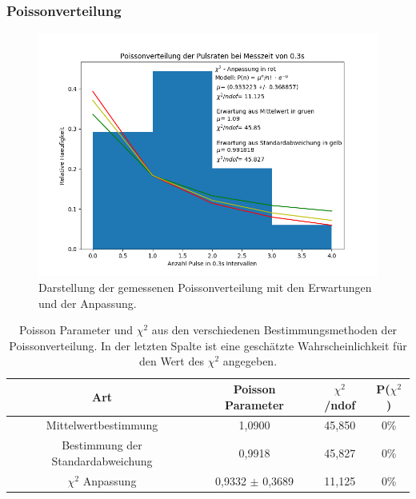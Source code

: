 \documentclass[12pt,a4paper]{article}
\begin{document}
\subsubsection{Poissonverteilung}
\begin{figure}
\centering
\includegraphics[scale=0.8]{Bilder/poisson.PNG}
\caption{Darstellung der gemessenen Poissonverteilung mit den Erwartungen und der Anpassung.}
\label{fig:Poisson}
\end{figure}

\begin{table}
\centering
\begin{tabular}{|c|c|c|c|}
\hline 
Art & Poisson Parameter & $\chi ^2$ /ndof & P($\chi ^2$) \\ 
\hline 
Mittelwertbestimmung & 1,0900 & 45,850 & 0\% \\ 
\hline 
Bestimmung der Standardabweichung & 0,9918 & 45,827 & 0\% \\ 
\hline 
$\chi ^2$ Anpassung & 0,9332 $\pm$ 0,3689 & 11,125 & 0\% \\ 
\hline 
\end{tabular} 
\caption{Poisson Parameter und $\chi ^2$ aus den verschiedenen Bestimmungsmethoden der Poissonverteilung. In der letzten Spalte ist eine geschätzte Wahrscheinlichkeit für den Wert des $\chi ^2$ angegeben.}
\label{tab:Poisson}
\end{table}
\end{document}
